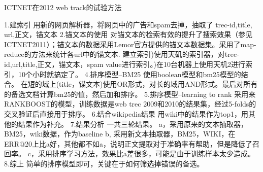 \documentclass{article}
\begin{document}
\begin{CJK}{UTF8}{gkai}

ICTNET在2012 web track的试验方法\newline

1.建索引\newline
用新的网页解析器，将网页中的广告和spam去掉，抽取了 trec-id,title, url,正文，锚文本\newline
2.锚文本的使用\newline
对锚文本的检索有效的提升了搜索效果（参见ICTNET2011）；锚文本的数据采用Lemor官方提供的锚文本数据集。采用了map-reduce的方法来统计各url中的锚文本. 建立索引)使用天矶的索引器，对trec-id,url,title,正文，锚文本，spam value进行索引。)在10台机器上使用天机2进行索引，10个小时就搞定了。\newline
4.排序模型--BM25\newline
使用boolean模型和bm25模型的结合。\newline
在短的域上(title，锚文本)使用OR形式，对长的域用AND形式。最后对所有的备选文档计算bm25的值，然后加和排序。\newline
5.排序模型--learning to rank\newline
采用来RANKBOOST的模型，训练数据是web trec 2009和2010的结果集，经过5-folds的交叉验证后直接用于排序。\newline
6.结合wikipedia结果\newline
用wiki中的结果作为top1，用其他的结果作为补充。\newline
7.结果分析\newline
一共三轮结果。\newline
a，采用原来的文本抽取器，BM25，wiki数据，作为baseline\newline
b, 采用新文本抽取器，BM25，WIKI，在ERR@20上比a好，其他都不如a，说明正文提取对于准确率有帮助，但是降低了召回率。\newline
c，采用排序学习方法，效果比a差很多，可能是由于训练样本太少造成。\newline
8.综上\newline
简单的排序模型即可，关键在于如何筛选掉错误的备选。\newline
\end{CJK}
\end{document}
